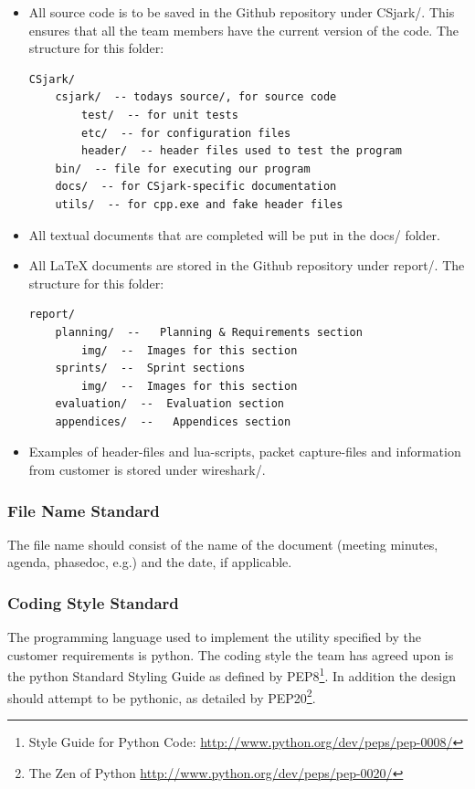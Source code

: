 \begin{itemize}
	\item All source code is to be saved in the Github \gls{repository} under
		CSjark/. This ensures that all the team members have the current
		version of the code. The structure for this folder:
		\begin{verbatim}
CSjark/
    csjark/  -- todays source/, for source code
        test/  -- for unit tests
        etc/  -- for configuration files
        header/  -- header files used to test the program
    bin/  -- file for executing our program
    docs/  -- for CSjark-specific documentation
    utils/  -- for cpp.exe and fake header files
		\end{verbatim}
	\item All textual documents that are completed will be put in the
		docs/ folder.
	\item All LaTeX documents are stored in the Github \gls{repository}
		under report/. The structure for this folder:
		\begin{verbatim}
report/
    planning/  --   Planning & Requirements section
        img/  --  Images for this section
    sprints/  --  Sprint sections
        img/  --  Images for this section
    evaluation/  --  Evaluation section
    appendices/  --   Appendices section
		\end{verbatim}
	\item Examples of \gls{header}-files and \Gls{lua}-\glspl{script}, \gls{packet} capture-files and information from customer is stored under \Gls{wireshark}/.
\end{itemize}

\subsubsection{File Name Standard}
The file name should consist of the name of the document (meeting minutes,
agenda, phasedoc, e.g.) and the date, if applicable.

\subsubsection{Coding Style Standard}
The programming language used to implement the utility specified by the
customer requirements is \Gls{python}. The coding style the team has agreed upon is
the \Gls{python} Standard Styling Guide as defined by
PEP8\footnote{Style Guide for Python Code: \url{http://www.python.org/dev/peps/pep-0008/}}.
In addition the design should attempt to be pythonic, as detailed by
PEP20\footnote{The Zen of Python \url{http://www.python.org/dev/peps/pep-0020/}}.

